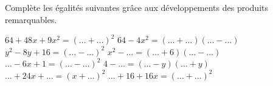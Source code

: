 %
%
Complète les égalités suivantes grâce aux développements des produits remarquables.
  \begin{tasks}
    \task $64+48x+9x^2=\left(\dots + \dots \right)^2$
    \task $64-4x^2=\left(\dots + \dots \right)\left(\dots - \dots\right)$
    \task $y^2-8y+16=\left(\dots - \dots \right)^2$
    \task $x^2 - \dots =\left(\dots + 6\right)\left(\dots - \dots \right)$
    \task $\dots - 6x + 1=\left(\dots - \dots \right)^2$
    \task $4 - \dots =\left(\dots - y \right)\left(\dots + y\right)$
    \task $\dots + 24x + \dots =\left(x + \dots \right)^2$
    \task $\dots + 16 + 16x=\left(\dots + \dots \right)^2$
  \end{tasks}
